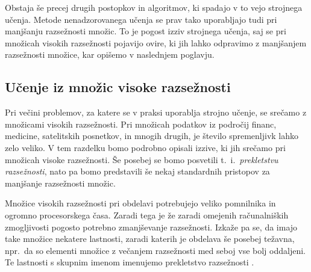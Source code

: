 \documentclass[12pt,a4paper,twoside]{article}
\theoremstyle{definition} %
\theoremstyle{plain} %
\numberwithin{equation}{section}  %
\begin{document}

Obstaja še precej drugih postopkov in algoritmov, ki spadajo v to vejo strojnega učenja. 
Metode nenadzorovanega učenja se prav tako uporabljajo tudi pri manjšanju razsežnosti množic. 
To je pogost izziv strojnega učenja, saj se pri množicah visokih razsežnosti pojavijo ovire, ki jih lahko odpravimo z manjšanjem razsežnosti množice, kar opišemo v naslednjem poglavju.



\subsection{Učenje iz množic visoke razsežnosti}

Pri večini problemov, za katere se v praksi uporablja strojno učenje, se srečamo z množicami visokih razsežnosti. 
Pri množicah podatkov iz področij financ, medicine, satelitskih posnetkov, in mnogih drugih, je število spremenljivk lahko zelo veliko. 
V tem razdelku bomo podrobno opisali izzive, ki jih srečamo pri množicah visoke razsežnosti. 
Še posebej se bomo posvetili t.~i.~\emph{prekletstvu razsežnosti}, nato pa bomo predstavili še nekaj standardnih pristopov za manjšanje razsežnosti množic.

Množice visokih razsežnosti pri obdelavi potrebujejo veliko pomnilnika in ogromno procesorskega časa. 
Zaradi tega je že zaradi omejenih računalniških zmogljivosti pogosto potrebno zmanjševanje razsežnosti. 
Izkaže pa se, da imajo take množice nekatere lastnosti, zaradi katerih je obdelava še posebej težavna, 
npr.\ da so elementi množice z večanjem razsežnosti med seboj vse bolj oddaljeni. 
Te lastnosti s skupnim imenom imenujemo prekletstvo razsežnosti \cite{bellman2015adaptive}. %

\end{document}
